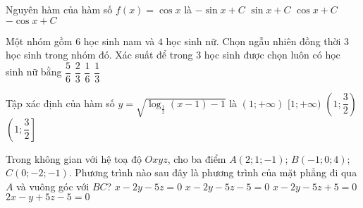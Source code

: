 \begin{ex}%
Nguyên hàm của hàm số $f(x)=\cos x$ là
\choice
{$-\sin x+C$}
{\True $\sin x+C$}
{$\cos x+C$}
{$-\cos x+C$}
\end{ex}

\begin{ex}%
Một nhóm gồm $6$ học sinh nam và $4$ học sinh nữ. Chọn ngẫu nhiên đồng thời $3$ học sinh trong nhóm đó. Xác suất để trong $3$ học sinh được chọn luôn có học sinh nữ bằng
\choice
{\True $\dfrac{5}{6}$}
{$\dfrac{2}{3}$}
{$\dfrac{1}{6}$}
{$\dfrac{1}{3}$}
\end{ex}

\begin{ex}%
Tập xác định của hàm số $y=\sqrt{\log_{\tfrac{1}{2}}(x-1)-1}$ là
\choice
{$(1;+\infty)$}
{$[1;+\infty)$}
{$\left(1;\dfrac{3}{2}\right)$}
{\True $\left(1;\dfrac{3}{2}\right]$}
\end{ex}

\begin{ex}%
Trong không gian với hệ toạ độ $Oxyz$, cho ba điểm $A(2;1;-1)$; $B(-1;0;4)$; $C(0;-2;-1)$. Phương trình nào sau đây là phương trình của mặt phẳng đi qua $A$ và vuông góc với $BC$?
\choice
{$x-2y-5z=0$}
{\True $x-2y-5z-5=0$}
{$x-2y-5z+5=0$}
{$2x-y+5z-5=0$}
\end{ex}

